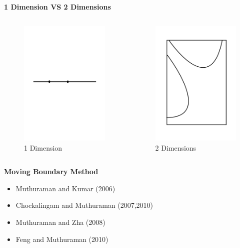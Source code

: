\documentclass{beamer}
\begin{document}
%
\begin{frame}
{\bf 1 Dimension VS 2 Dimensions}
\begin{columns}

   \begin{figure}[hbt]
   \includegraphics[width = 5cm]{1D.pdf}
   \caption{1 Dimension}
   \end{figure}
 
  \begin{figure}[hbt]
  \includegraphics[width = 5cm]{2D1.pdf}
  \caption{2 Dimensions}
  \end{figure}
\end{columns}

\end{frame}

\begin{frame}
{\bf Moving Boundary Method}

\begin{itemize}
  \item Muthuraman and Kumar (2006)
  \item Chockalingam and Muthuraman (2007,2010)
  \item Muthuraman and Zha (2008)
  \item Feng and Muthuraman (2010)
\end{itemize}
\end{frame}
\end{document}
